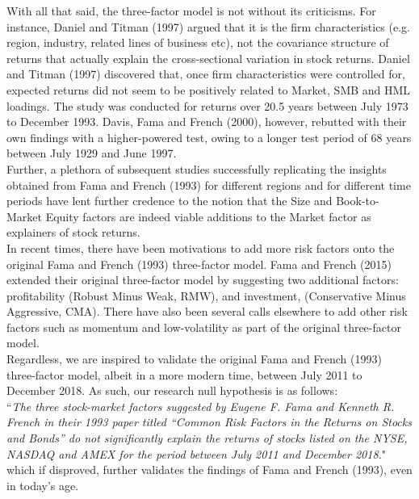 \documentclass[12pt]{article}
\begin{document}
	\noindent With all that said, the three-factor model is not without its criticisms. For instance, Daniel and Titman (1997) argued that it is the firm characteristics (e.g. region, industry, related lines of business etc), not the covariance structure of returns that actually explain the cross-sectional variation in stock returns. Daniel and Titman (1997) discovered that, once firm
	characteristics were controlled for, expected returns did not seem to be positively related to Market, SMB and HML loadings. The study was conducted for returns over 20.5 years between July 1973 to December 1993. Davis, Fama and French (2000), however, rebutted with their own findings with a higher-powered test, owing to a longer test period of 68 years between July 1929 and June 1997.\\
	
	\noindent Further, a plethora of subsequent studies successfully replicating the insights obtained from Fama and French (1993) for different regions and for different time periods have lent further credence to the notion that the Size and Book-to-Market Equity factors are indeed viable additions to the Market factor as explainers of stock returns.\\
	
	\noindent In recent times, there have been motivations to add more risk factors onto the original Fama and French (1993) three-factor model. Fama and French (2015) extended their original three-factor model by suggesting two additional factors: profitability (Robust Minus Weak, RMW), and investment, (Conservative Minus Aggressive, CMA). There have also been several calls elsewhere to add other risk factors such as momentum and low-volatility as part of the original three-factor model. \\
	
	\noindent Regardless, we are inspired to validate the original Fama and French (1993) three-factor model, albeit in a more modern time, between July 2011 to December 2018. As such, our research null hypothesis is as follows:\\
	
	``\textit{The three stock-market factors suggested by Eugene F. Fama and Kenneth R. French in their 1993 paper titled “Common Risk Factors in the Returns on Stocks and Bonds” do not significantly explain the returns of stocks listed on the NYSE, NASDAQ and AMEX for the period between July 2011 and December 2018.}" \\

	\noindent which if disproved, further validates the findings of Fama and French (1993), even in today's age.
	
\end{document}
